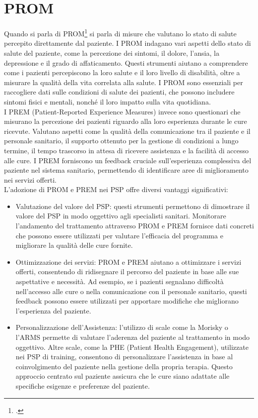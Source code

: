 \section{PROM}
Quando si parla di PROM\footcite{site:utilizzo-prom-prem} si parla di misure che valutano lo stato di salute percepito direttamente dal paziente. I PROM indagano vari aspetti dello stato di salute del paziente, come la percezione dei sintomi, il dolore, l'ansia, la depressione e il grado di affaticamento. Questi strumenti aiutano a comprendere come i pazienti percepiscono la loro salute e il loro livello di disabilità, oltre a misurare la qualità della vita correlata alla salute. I PROM sono essenziali per raccogliere dati sulle condizioni di salute dei pazienti, che possono includere sintomi fisici e mentali, nonché il loro impatto sulla vita quotidiana.\\
I PREM (Patient-Reported Experience Measures) invece sono questionari che misurano la percezione dei pazienti riguardo alla loro esperienza durante le cure ricevute. Valutano aspetti come la qualità della comunicazione tra il paziente e il personale sanitario, il supporto ottenuto per la gestione di condizioni a lungo termine, il tempo trascorso in attesa di ricevere assistenza e la facilità di accesso alle cure. I PREM forniscono un feedback cruciale sull'esperienza complessiva del paziente nel sistema sanitario, permettendo di identificare aree di miglioramento nei servizi offerti.\\
L'adozione di PROM e PREM nei PSP offre diversi vantaggi significativi:
\begin{itemize}
    \item Valutazione del valore del PSP: questi strumenti permettono di dimostrare il valore del PSP in modo oggettivo agli specialisti sanitari. Monitorare l'andamento del trattamento attraverso PROM e PREM fornisce dati concreti che possono essere utilizzati per valutare l'efficacia del programma e migliorare la qualità delle cure fornite.
    \item Ottimizzazione dei servizi: PROM e PREM aiutano a ottimizzare i servizi offerti, consentendo di ridisegnare il percorso del paziente in base alle sue aspettative e necessità. Ad esempio, se i pazienti segnalano difficoltà nell'accesso alle cure o nella comunicazione con il personale sanitario, questi feedback possono essere utilizzati per apportare modifiche che migliorano l'esperienza del paziente.
    \item Personalizzazione dell'Assistenza: l'utilizzo di scale come la Morisky o l'ARMS permette di valutare l'aderenza del paziente al trattamento in modo oggettivo. Altre scale, come la PHE (Patient Health Engagement), utilizzate nei PSP di training, consentono di personalizzare l'assistenza in base al coinvolgimento del paziente nella gestione della propria terapia. Questo approccio centrato sul paziente assicura che le cure siano adattate alle specifiche esigenze e preferenze del paziente.
\end{itemize}

